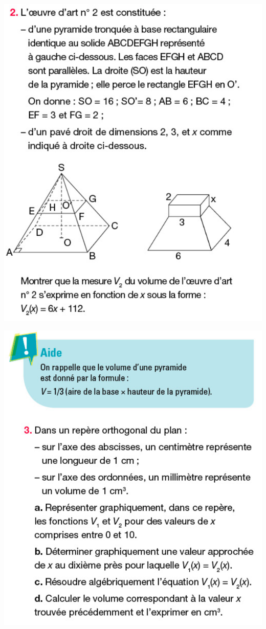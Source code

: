 \documentclass[9pt]{beamer}
\begin{document}
\begin{frame}
\begin{multicols}{3}
		\includegraphics[width=\linewidth]{Images/Exercice 120 page 77 - question 2.png}

		\columnbreak

		\includegraphics[width=\linewidth]{Images/Exercice 120 page 77 - question 3.png}
	\end{multicols}
\end{frame}
\end{document}
